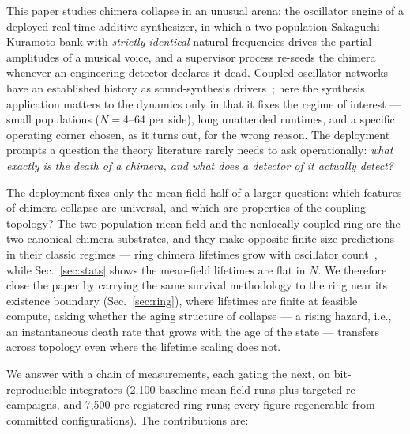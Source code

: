 \documentclass[pdflatex,sn-mathphys,Numbered]{sn-jnl}
\begin{document}
This paper studies chimera collapse in an unusual arena: the oscillator engine of a
deployed real-time additive synthesizer, in which a two-population
Sakaguchi--Kuramoto bank with \emph{strictly identical} natural frequencies drives
the partial amplitudes of a musical voice, and a supervisor process re-seeds the
chimera whenever an engineering detector declares it dead. Coupled-oscillator
networks have an established history as sound-synthesis drivers~\cite{lem2019,lemsmc};
here the synthesis application matters to the dynamics only in that it fixes the
regime of interest --- small populations ($N = 4$--$64$ per side), long unattended
runtimes, and a specific operating corner chosen, as it turns out, for the wrong
reason. The deployment prompts a question the theory literature rarely needs to ask
operationally: \emph{what exactly is the death of a chimera, and what does a detector
of it actually detect?}

The deployment fixes only the mean-field half of a larger question: which features
of chimera collapse are universal, and which are properties of the coupling
topology? The two-population mean field and the nonlocally coupled ring are the two
canonical chimera substrates, and they make opposite finite-size predictions in
their classic regimes --- ring chimera lifetimes grow with oscillator
count~\cite{wo2011}, while Sec.~\ref{sec:stats} shows the mean-field lifetimes are
flat in $N$. We therefore close the paper by carrying the same survival methodology
to the ring near its existence boundary (Sec.~\ref{sec:ring}), where lifetimes are
finite at feasible compute, asking whether the aging structure of collapse --- a
rising hazard, i.e., an instantaneous death rate that grows with the age of the
state --- transfers across topology even where the lifetime scaling does not.

We answer with a chain of measurements, each gating the next, on bit-reproducible
integrators (2{,}100 baseline mean-field runs plus targeted re-campaigns, and
7{,}500 pre-registered ring runs; every figure regenerable from committed
configurations). The contributions are:
\end{document}
